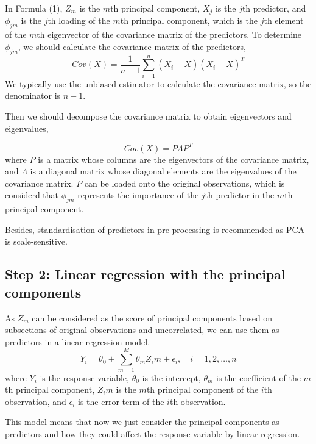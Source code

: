 \documentclass{article}
\begin{document}
In Formula (1), \(Z_m\) is the \(m\)th principal component, \(X_j\) is the \(j\)th predictor, and \(\phi_{jm}\) is the \(j\)th loading of the \(m\)th principal component, which is the \(j\)th element of the \(m\)th eigenvector of the covariance matrix of the predictors. 
To determine \(\phi_{jm}\), we should calculate the covariance matrix of the predictors, 
\begin{equation}
    Cov(X) = \frac{1}{n - 1} \sum_{i=1}^{n} (X_i - \bar{X}) (X_i - \bar{X})^T
\end{equation}
We typically use the unbiased estimator to calculate the covariance matrix, so the denominator is \(n - 1\). 

Then we should decompose the covariance matrix to obtain eigenvectors and eigenvalues, 

\begin{equation}
    Cov(X) = P \Lambda P^T
\end{equation}
where \(P\) is a matrix whose columns are the eigenvectors of the covariance matrix, and \(\Lambda\) is a diagonal matrix whose diagonal elements are the eigenvalues of the covariance matrix. 
\(P\) can be loaded onto the original observations, which is considerd that \(\phi_{jm}\) represents the importance of the \(j\)th predictor in the \(m\)th principal component.

Besides, standardisation of predictors in pre-processing is recommended as PCA is scale-sensitive. 

\subsection{Step 2: Linear regression with the principal components}
As \(Z_m\) can be considered as the score of principal components based on subsections of original observations and uncorrelated, we can use them as predictors in a linear regression model.
\begin{equation}
    Y_i = \theta_0 + \sum_{m=1}^{M} \theta_m Z_im + \epsilon_i, \quad i = 1, 2, \dots, n
\end{equation}
where \(Y_i\) is the response variable, \(\theta_0\) is the intercept, \(\theta_m\) is the coefficient of the \(m\)th principal component, \(Z_im\) is the \(m\)th principal component of the \(i\)th observation, and \(\epsilon_i\) is the error term of the \(i\)th observation. 

This model means that now we just consider the principal components as predictors and how they could affect the response variable by linear regression.
\end{document}
